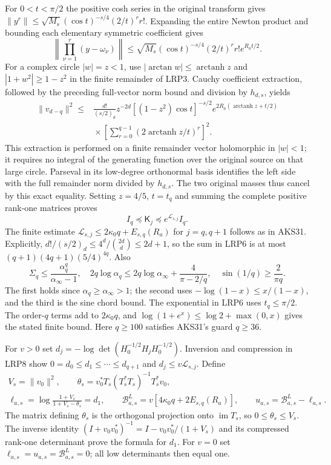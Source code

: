 For $0<t<\pi/2$ the positive cosh series in the original transform gives
$\|y^r\|\le\sqrt{M_s}(\cos t)^{-s/4}(2/t)^r r!$.
Expanding the entire Newton product and bounding each elementary
symmetric coefficient gives
\[
 \left\|\prod_{\nu=1}^{r}(y-\omega_\nu)\right\|
 \le\sqrt{M_s}(\cos t)^{-s/4}(2/t)^r r!e^{R_at/2}.
\]
For a complex circle $|w|=z<1$, use
$|\arctan w|\le\operatorname{arctanh}z$ and
$|1+w^2|\ge1-z^2$ in the finite remainder of LRP3.
Cauchy coefficient extraction, followed by the preceding full-vector
norm bound and division by $h_{d,s}$, yields
\[
\begin{split}
 \|v_{d-q}\|^2\le{}&\frac{d!}{(s/2)_d}z^{-2d}
 [(1-z^2)\cos t]^{-s/2}
 e^{2R_a(\operatorname{arctanh}z+t/2)}\\
 &\mathrel{}\times
 \left[\sum_{r=0}^{q-1}
       (2\operatorname{arctanh}z/t)^r\right]^2.
\end{split}\tag{LRP7}
\]
This extraction is performed on a finite remainder vector holomorphic
in $|w|<1$; it requires no integral of the generating function over
the original source on that large circle. Parseval in its low-degree
orthonormal basis identifies the left side with the full remainder
norm divided by $h_{d,s}$. The two original masses thus cancel by
this exact equality. Setting $z=4/5$, $t=t_q$ and summing the complete
positive rank-one matrices proves
\[
 I_q\preceq\mathsf K_j\preceq e^{\mathcal L_{s,j}}I_q.
 \tag{LRP8}
\]
The finite estimate $\mathcal L_{s,j}\le2\kappa_0q+E_{s,q}(R_a)$
for $j=q,q+1$ follows as in AKS31. Explicitly,
$d!/(s/2)_d\le4^d/\binom{2d}{d}\le2d+1$, so the sum in LRP6
is at most $(q+1)(4q+1)(5/4)^{4q}$. Also
\[
 \Sigma_q\le\frac{\alpha_q^q}{\alpha_\infty-1},\quad
 2q\log\alpha_q\le2q\log\alpha_\infty+\frac4{\pi-2/q},\quad
 \sin(1/q)\ge\frac2{\pi q}.
\]
The first holds since $\alpha_q\ge\alpha_\infty>1$; the second
uses $-\log(1-x)\le x/(1-x)$, and the third is the sine chord bound.
The exponential in LRP6 uses $t_q\le\pi/2$. The order-$q$ terms add
to $2\kappa_0q$, and $\log(1+e^x)\le\log2+\max(0,x)$ gives the
stated finite bound. Here $q\ge100$ satisfies AKS31's guard $q\ge36$.

For $v>0$ set $d_j=-\log\det(H_0^{-1/2}H_jH_0^{-1/2})$.
Inversion and compression in LRP8 show
$0=d_0\le d_1\le\cdots\le d_{q+1}$ and
$d_j\le v\mathcal L_{s,j}$. Define
\[
\begin{gathered}
 V_s=\|v_0\|^2,\qquad
 \theta_s=v_0^*T_s(T_s^*T_s)^{-1}T_s^*v_0,\\
 \ell_{a,s}=\log\frac{1+V_s}{1+V_s-\theta_s}=d_1,\qquad
 \mathcal B^{L}_{a,s}=v[4\kappa_0q+2E_{s,q}(R_a)],\qquad
 u_{a,s}=\mathcal B^{L}_{a,s}-\ell_{a,s}.
\end{gathered}\tag{LRP9}
\]
The matrix defining $\theta_s$ is the orthogonal projection onto
$\operatorname{im}T_s$, so $0\le\theta_s\le V_s$.
The inverse identity
$(I+v_0v_0^*)^{-1}=I-v_0v_0^*/(1+V_s)$ and its compressed
rank-one determinant prove the formula for $d_1$.
For $v=0$ set $\ell_{a,s}=u_{a,s}=\mathcal B^L_{a,s}=0$;
all low determinants then equal one.

